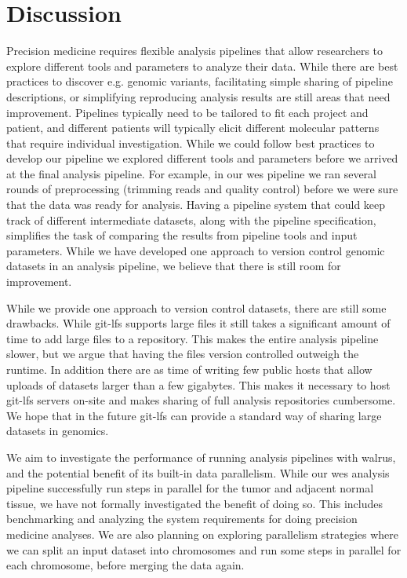 \section{Discussion}
Precision medicine requires flexible analysis pipelines that allow researchers
to explore different tools and parameters to analyze their data. While there are
best practices to discover e.g. genomic variants, facilitating simple sharing of
pipeline descriptions, or simplifying reproducing analysis results are still
areas that need improvement. Pipelines typically need 
to be tailored to fit each project and patient, and different patients will
typically elicit different molecular patterns that require individual
investigation. While we could follow best practices to develop our pipeline we
explored different tools and parameters before we arrived at the final analysis
pipeline. 
For example, in our \gls{wes} pipeline we ran several rounds of preprocessing
(trimming reads and quality control) before we were sure that the data was ready
for analysis. Having a pipeline system that could keep track of different
intermediate datasets, along with the pipeline specification, simplifies the
task of comparing the results from pipeline tools and input parameters. While we
have developed one approach to version control genomic datasets in an analysis
pipeline, we believe that there is still room for improvement. 

While we provide one approach to version control datasets, there are still some
drawbacks. While git-lfs supports large files it
still takes a significant amount of time to add large files to a repository.
This makes the entire analysis pipeline slower, but we argue that having the
files version controlled outweigh the runtime. In addition there are as time of
writing few public hosts that allow uploads of datasets larger than a few
gigabytes. This makes it necessary to host git-lfs servers on-site and makes
sharing of full analysis repositories cumbersome. We hope that in the future
git-lfs can provide a standard way of sharing large datasets in genomics. 

We aim to investigate the performance of running analysis pipelines with walrus,
and the potential benefit of its built-in data parallelism. While
our \gls{wes} analysis pipeline successfully run steps in parallel for the
tumor and adjacent normal tissue, we have not formally investigated the benefit
of doing so. This includes benchmarking and analyzing the system requirements
for doing precision medicine analyses. 
We are also planning on exploring parallelism strategies where we
can split an input dataset into chromosomes and run some steps in parallel for
each chromosome, before merging the data again. 

